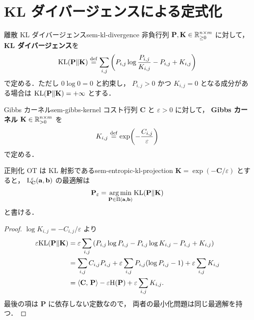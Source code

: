 \section{KL ダイバージェンスによる定式化}
\label{sec:sem-kl-formulation}

\begin{definition}{離散 KL ダイバージェンス}{sem-kl-divergence}
  非負行列 $\mathbf{P}, \mathbf{K} \in \mathbb{R}_{\geq 0}^{n \times m}$ に対して，
  \textbf{KL ダイバージェンス}を
  \[
    \mathrm{KL}(\mathbf{P} \| \mathbf{K})
    \overset{\mathrm{def}}{=}
    \sum_{i,j}
    \left(
      P_{i,j}\log\frac{P_{i,j}}{K_{i,j}}
      - P_{i,j} + K_{i,j}
    \right)
  \]
  で定める．ただし $0\log 0 = 0$ と約束し，
  $P_{i,j} > 0$ かつ $K_{i,j}=0$ となる成分がある場合は
  $\mathrm{KL}(\mathbf{P}\|\mathbf{K}) = +\infty$ とする．
\end{definition}

\begin{definition}{Gibbs カーネル}{sem-gibbs-kernel}
  コスト行列 $\mathbf{C}$ と $\varepsilon > 0$ に対して，
  \textbf{Gibbs カーネル} $\mathbf{K} \in \mathbb{R}_{>0}^{n \times m}$ を
  \[
    K_{i,j} \overset{\mathrm{def}}{=} \exp\!\left(-\frac{C_{i,j}}{\varepsilon}\right)
  \]
  で定める．
\end{definition}

\begin{proposition}{正則化 OT は KL 射影である}{sem-entropic-kl-projection}
  $\mathbf{K} = \exp(-\mathbf{C}/\varepsilon)$ とすると，
  $\mathrm{L}_{\mathbf{C}}^\varepsilon(\mathbf{a}, \mathbf{b})$ の最適解は
  \[
    \mathbf{P}_\varepsilon
    =
    \operatorname*{arg\,min}_{\mathbf{P} \in \Pi(\mathbf{a}, \mathbf{b})}
    \mathrm{KL}(\mathbf{P}\|\mathbf{K})
  \]
  と書ける．
\end{proposition}

\begin{proof}
  $\log K_{i,j} = -C_{i,j}/\varepsilon$ より
  \begin{align*}
    \varepsilon \mathrm{KL}(\mathbf{P}\|\mathbf{K})
    &=
    \varepsilon\sum_{i,j}
    \left(
      P_{i,j}\log P_{i,j}
      - P_{i,j}\log K_{i,j}
      - P_{i,j}
      + K_{i,j}
    \right) \\
    &=
    \sum_{i,j} C_{i,j}P_{i,j}
    + \varepsilon\sum_{i,j} P_{i,j}(\log P_{i,j}-1)
    + \varepsilon\sum_{i,j} K_{i,j} \\
    &=
    \langle \mathbf{C},\, \mathbf{P} \rangle - \varepsilon \mathrm{H}(\mathbf{P})
    + \varepsilon\sum_{i,j} K_{i,j}.
  \end{align*}
  最後の項は $\mathbf{P}$ に依存しない定数なので，
  両者の最小化問題は同じ最適解を持つ．
\end{proof}

